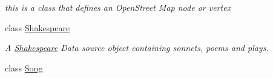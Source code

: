 \begin{DoxyCompactItemize}
\begin{DoxyCompactList}\small\item\em this is a class that defines an Open\+Street Map node or vertex \end{DoxyCompactList}\item 
class \hyperlink{classbridges_1_1data__src__dependent_1_1_shakespeare}{Shakespeare}
\begin{DoxyCompactList}\small\item\em A \hyperlink{classbridges_1_1data__src__dependent_1_1_shakespeare}{Shakespeare} Data source object containing sonnets, poems and plays. \end{DoxyCompactList}\item 
class \hyperlink{classbridges_1_1data__src__dependent_1_1_song}{Song}
\end{DoxyCompactItemize}
